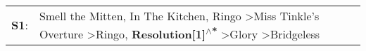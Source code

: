 \begin{supertabular}{p{0.03\textwidth}p{0.92\textwidth}}
 \textbf{S1}:  &  Smell the Mitten\textsuperscript{}, \enspace In The Kitchen\textsuperscript{}, \enspace Ringo\textsuperscript{} \textgreater \enspace Miss Tinkle's Overture\textsuperscript{} \textgreater \enspace Ringo\textsuperscript{}, \enspace \textbf{Resolution[1]\textsuperscript{$\wedge$*}} \textgreater \enspace Glory\textsuperscript{} \textgreater \enspace Bridgeless\textsuperscript{}  \enspace  \\
\end{supertabular}
